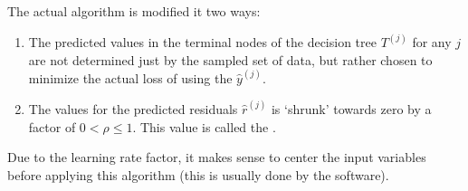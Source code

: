 \documentclass[xetex,mathserif,serif,aspectratio=169]{beamer}
\begin{document}
\begin{frame}[fragile] \frametitle{} \oldB \small

\textbf{}

The actual algorithm is modified it two ways:
\begin{enumerate}
\item The predicted values in the terminal nodes of the decision tree $T^{(j)}$
for any $j$ are not determined just by the sampled set of data, but rather chosen
to minimize the actual loss of using the $\widehat{y}^{(j)}$.
\item The values for the predicted residuals $\widehat{r}^{(j)}$ is `shrunk' towards
zero by a factor of $0 < \rho \leq 1$. This value is called the .
\end{enumerate}
Due to the learning rate factor, it makes sense to center the input variables before
applying this algorithm (this is usually done by the software).

\end{frame}
\end{document}
